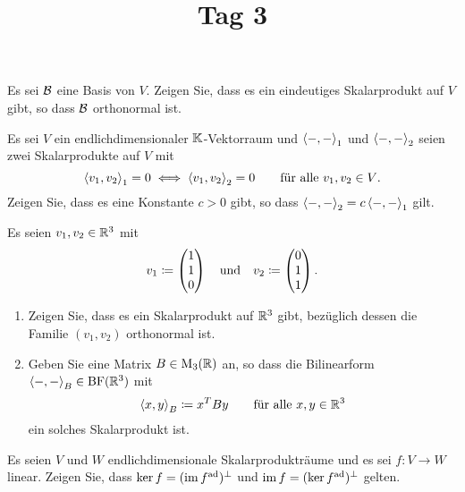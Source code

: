 \documentclass[a4paper, 10pt]{scrartcl}
\title{Tag 3}
\author{}
\date{}
\begin{document}
\begin{question}
  Es sei $\mathcal{B}$ eine Basis von $V$.
  Zeigen Sie, dass es ein eindeutiges Skalarprodukt auf $V$ gibt, so dass $\mathcal{B}$ orthonormal ist.
\end{question}





\begin{question}
  Es sei $V$ ein endlichdimensionaler $\mathbb{K}$-Vektorraum und $\left\langle -, - \right\rangle_1$ und $\left\langle -, - \right\rangle_2$ seien zwei Skalarprodukte auf $V$ mit
  \[
          \left\langle v_1, v_2 \right\rangle_1 = 0
    \iff  \left\langle v_1, v_2 \right\rangle_2 = 0
    \qquad
    \text{für alle $v_1, v_2 \in V$}.
  \]
  Zeigen Sie, dass es eine Konstante $c > 0$ gibt, so dass $\left\langle -, - \right\rangle_2 = c \left\langle -, - \right\rangle_1$ gilt.
\end{question}





\begin{question}
  Es seien $v_1, v_2 \in \mathbb{R}^3$ mit
  \[
              v_1
    \coloneqq \begin{pmatrix} 1 \\ 1 \\ 0 \end{pmatrix}
    \quad\text{und}\quad
              v_2
    \coloneqq \begin{pmatrix} 0 \\ 1 \\ 1 \end{pmatrix}.
  \]
  \begin{enumerate}
    \item
      Zeigen Sie, dass es ein Skalarprodukt auf $\mathbb{R}^3$ gibt, bezüglich dessen die Familie $(v_1, v_2)$ orthonormal ist.
    \item
      Geben Sie eine Matrix $B \in \operatorname{M}_{3}(\mathbb{R})$ an, so dass die Bilinearform $\left\langle -, - \right\rangle_B \in \operatorname{BF}(\mathbb{R}^3)$ mit
      \[
                  \left\langle x, y \right\rangle_B
        \coloneqq x^T B y
        \qquad
        \text{für alle $x, y \in \mathbb{R}^3$}
      \]
      ein solches Skalarprodukt ist.
  \end{enumerate}
\end{question}





\begin{question}
  Es seien $V$ und $W$ endlichdimensionale Skalarprodukträume und es sei $f \colon V \to W$ linear.
  Zeigen Sie, dass $\ker f = (\operatorname{im} f^{\operatorname{ad}})^\perp$ und $\operatorname{im} f = (\ker f^{\operatorname{ad}})^\perp$ gelten.
\end{question}
\end{document}
